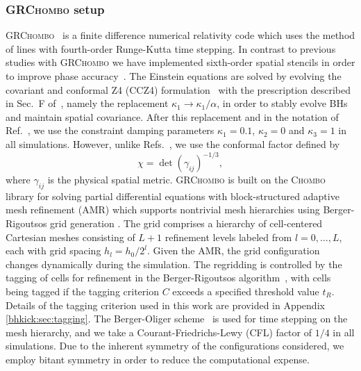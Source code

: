 \subsubsection{\textsc{GRChombo} setup}
\label{bhkick:sec:grchombo}
\textsc{GRChombo}~\cite{Clough:2015sqa} is a finite difference
numerical relativity code which uses the method of lines with
fourth-order Runge-Kutta time stepping. In contrast to previous studies
with \textsc{GRChombo} we have implemented sixth-order spatial
stencils in order to improve phase accuracy~\cite{Husa:2007hp}. The
Einstein equations are solved by evolving the covariant and conformal
Z4 (CCZ4) formulation~\cite{Alic:2011gg} with the prescription
described in Sec.~F of~\cite{Alic:2013xsa}, namely the replacement
$\kappa_1 \to \kappa_1/\alpha$, in order to stably evolve BHs
and maintain spatial covariance. After this replacement and in the
notation of Ref.~\cite{Alic:2011gg}, we use the constraint damping
parameters $\kappa_1=0.1$, $\kappa_2=0$ and $\kappa_3=1$ in all
simulations.  However, unlike Refs.~\cite{Clough:2015sqa,Alic:2011gg},
we use the conformal factor defined by
\begin{equation}
    \chi = \det(\gamma_{ij})^{-1/3},\label{bhkick:eq:con-fac}
\end{equation}
where $\gamma_{ij}$ is the physical spatial metric.
\textsc{GRChombo} is built on the \textsc{Chombo}~\cite{ChomboReport}
library for solving partial differential equations with
block-structured adaptive mesh refinement (AMR) which supports
nontrivial mesh hierarchies using Berger-Rigoutsos grid generation
\cite{Berger1991}. The grid comprises a hierarchy of cell-centered
Cartesian meshes consisting of $L+1$ refinement levels labeled from
$l=0,\ldots,L$, each with grid spacing $h_l=h_0/2^l$. Given the
AMR, the grid configuration changes dynamically during the simulation.
The regridding is controlled by the tagging of cells for refinement
in the Berger-Rigoutsos algorithm~\cite{Berger1991}, with cells being
tagged if the tagging criterion $C$ exceeds a specified threshold
value $t_R$. Details of the tagging criterion used in this work are
provided in Appendix \ref{bhkick:sec:tagging}. The Berger-Oliger scheme~\cite{Berger1991}
is used for time stepping on the mesh hierarchy, and we take a
Courant-Friedrichs-Lewy (CFL) factor of $1/4$ in all simulations.
Due to the inherent symmetry of the configurations considered, we
employ bitant symmetry in order to reduce the computational expense.

